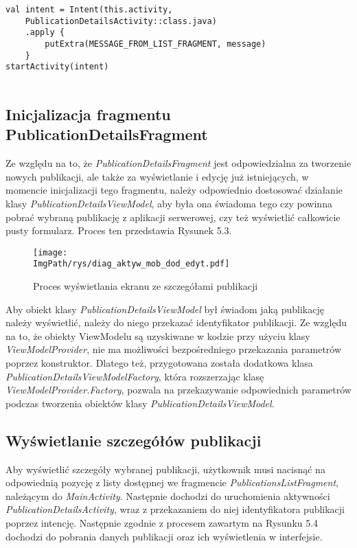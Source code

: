 \documentclass[a4paper,12pt,twoside,openany]{report}
\newcommand{\ImgPath}{.}
\begin{document}
\begin{lstlisting}[caption=Przełączanie się pomiędzy aktywnościami,label=code1,captionpos=b]
val intent = Intent(this.activity,
    PublicationDetailsActivity::class.java)
    .apply {
        putExtra(MESSAGE_FROM_LIST_FRAGMENT, message)
    }
startActivity(intent)
    
\end{lstlisting} 

\subsection{Inicjalizacja fragmentu PublicationDetailsFragment}
Ze względu na to, że \textit{PublicationDetailsFragment} jest odpowiedzialna za tworzenie nowych publikacji, ale także za wyświetlanie i edycję już istniejących, w momencie inicjalizacji tego fragmentu, należy odpowiednio dostosować działanie klasy \textit{PublicationDetailsViewModel}, aby była ona świadoma tego czy powinna pobrać wybraną publikację z aplikacji serwerowej, czy też wyświetlić całkowicie pusty formularz. Proces ten przedstawia Rysunek 5.3.

\begin{figure}[!htbp]
	\begin{center}
		\centering
		\texttt{[image: \\ImgPath/rys/diag\_aktyw\_mob\_dod\_edyt.pdf]}
	\end{center}
	\caption{Proces wyświetlania ekranu ze szczegółami publikacji}
	\label{diagramAktywnosciMobDodEdyt}
\end{figure}


Aby obiekt klasy \textit{PublicationDetailsViewModel} był świadom jaką publikację należy wyświetlić, należy do niego przekazać identyfikator publikacji. Ze względu na to, że obiekty ViewModelu są uzyskiwane w kodzie przy użyciu klasy \textit{ViewModelProvider}, nie ma możliwości bezpośredniego przekazania parametrów poprzez konstruktor. Dlatego też, przygotowana została dodatkowa klasa \textit{PublicationDetailsViewModelFactory}, która rozszerzając klasę \textit{ViewModelProvider.Factory}, pozwala na przekazywanie odpowiednich parametrów podczas tworzenia obiektów klasy  \textit{PublicationDetailsViewModel}.



\subsection{Wyświetlanie szczegółów publikacji}
Aby wyświetlić szczegóły wybranej publikacji, użytkownik musi nacisnąć na odpowiednią pozycję z listy dostępnej we fragmencie \textit{PublicationsListFragment}, należącym do \textit{MainActivity}.  Następnie dochodzi do uruchomienia aktywności \textit{PublicationDetailsActivity}, wraz z przekazaniem do niej identyfikatora publikacji poprzez intencję. Następnie zgodnie z procesem zawartym na Rysunku 5.4 dochodzi do pobrania danych publikacji oraz ich wyświetlenia w interfejsie.
\end{document}
